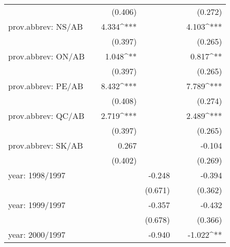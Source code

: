 \begin{tabular}{lD{.}{.}{3}D{.}{.}{3}D{.}{.}{3}D{.}{.}{3}D{.}{.}{3}}
                                                                                                &  & (0.406) &  &  & (0.272)\\
prov.abbrev: NS/AB                                                                              &  & 4.334^{***} &  &  & 4.103^{***}\\
                                                                                                &  & (0.397) &  &  & (0.265)\\
prov.abbrev: ON/AB                                                                              &  & 1.048^{**} &  &  & 0.817^{**}\\
                                                                                                &  & (0.397) &  &  & (0.265)\\
prov.abbrev: PE/AB                                                                              &  & 8.432^{***} &  &  & 7.789^{***}\\
                                                                                                &  & (0.408) &  &  & (0.274)\\
prov.abbrev: QC/AB                                                                              &  & 2.719^{***} &  &  & 2.489^{***}\\
                                                                                                &  & (0.397) &  &  & (0.265)\\
prov.abbrev: SK/AB                                                                              &  & 0.267 &  &  & -0.104\\
                                                                                                &  & (0.402) &  &  & (0.269)\\
year: 1998/1997                                                                                 &  &  & -0.248 &  & -0.394\\
                                                                                                &  &  & (0.671) &  & (0.362)\\
year: 1999/1997                                                                                 &  &  & -0.357 &  & -0.432\\
                                                                                                &  &  & (0.678) &  & (0.366)\\
year: 2000/1997                                                                                 &  &  & -0.940 &  & -1.022^{**}\\

\end{tabular}
